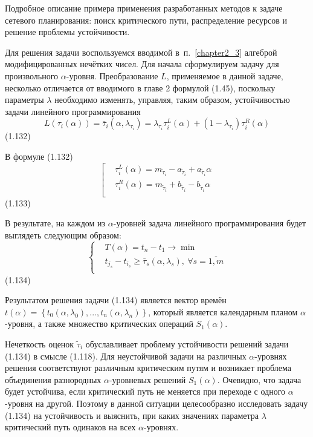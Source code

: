 Подробное описание примера применения разработанных методов к задаче сетевого планирования: поиск критического пути, распределение 
ресурсов и решение проблемы устойчивости.

Для решения задачи воспользуемся вводимой в~п.~\ref{chapter2_3} алгеброй модифицированных нечётких чисел. Для начала сформулируем задачу для произвольного $\alpha$-уровня. Преобразование $L$, применяемое в данной задаче, несколько отличается от вводимого в главе 2 формулой (1.45), поскольку параметры $\lambda$ необходимо изменять, управляя, таким образом, устойчивостью задачи линейного программирования
	\[L({{\tau }_{i}}(\alpha ))={{\bar{\tau }}_{i}}(\alpha ,{{\lambda }_{{{\tau }_{i}}}})={{\lambda }_{{{\tau }_{i}}}}\tau _{i}^{L}(\alpha )+(1-{{\lambda }_{{{\tau }_{i}}}})\tau _{i}^{R}(\alpha )\] 	(1.132)

В формуле (1.132)
	\[\left[ \begin{aligned}
  & \tau _{i}^{L}(\alpha )={{m}_{{{{\tilde{\tau }}}_{i}}}}-{{a}_{{{{\tilde{\tau }}}_{i}}}}+{{a}_{{{{\tilde{\tau }}}_{i}}}}\alpha  \\ 
 & \tau _{i}^{R}(\alpha )={{m}_{{{{\tilde{\tau }}}_{i}}}}+{{b}_{{{{\tilde{\tau }}}_{i}}}}-{{b}_{{{{\tilde{\tau }}}_{i}}}}\alpha  \\ 
\end{aligned} \right.\] 	(1.133)

В результате, на каждом из $\alpha$-уровней задача линейного программирования будет выглядеть следующим образом:
	\[\left\{ \begin{aligned}
  & T(\alpha )={{t}_{n}}-{{t}_{1}}\to \min  \\ 
 & {{t}_{{{j}_{s}}}}-{{t}_{{{i}_{s}}}}\ge {{{\bar{\tau }}}_{s}}(\alpha ,{{\lambda }_{s}}),\ \forall s=\overline{1,m} \\ 
\end{aligned} \right.\] 	(1.134)

Результатом решения задачи (1.134) является вектор времён $t\left( \alpha  \right)=\left\{ {{t}_{0}}(\alpha ,{{\lambda }_{0}}),...,{{t}_{n}}(\alpha ,{{\lambda }_{n}}) \right\}$, который является календарным планом $\alpha$-уровня, а также множество критических операций ${{S}_{1}}\left( \alpha  \right)$. 

Нечеткость оценок ${{\tilde{\tau }}_{i}}$ обуславливает проблему устойчивости решений задачи (1.134) в смысле (1.118). Для неустойчивой задачи на различных $\alpha $-уровнях решения соответствуют различным критическим путям и возникает проблема объединения разнородных $\alpha $-уровневых решений ${{S}_{1}}\left( \alpha  \right)$. Очевидно, что задача будет устойчива, если критический путь не меняется при переходе с одного $\alpha $-уровня на другой. Поэтому в данной ситуации целесообразно исследовать задачу (1.134) на устойчивость и выяснить, при каких значениях параметра $\lambda $ критический путь одинаков на всех $\alpha $-уровнях. 

